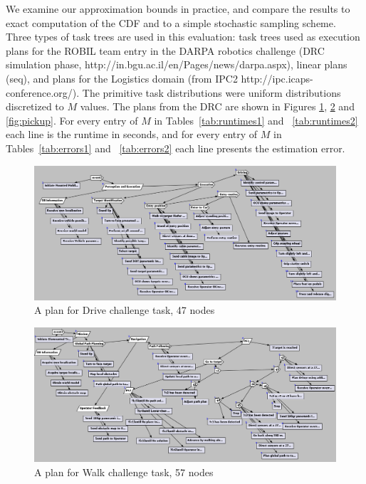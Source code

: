 \documentclass[review]{elsarticle}
\begin{document}
We examine our approximation bounds in practice, and compare the results to
exact computation of the CDF and to a simple stochastic sampling scheme. Three types of task trees
are used in this evaluation:
task trees used as execution plans for the ROBIL team entry in the DARPA
robotics challenge (DRC simulation phase, http://in.bgu.ac.il/en/Pages/news/dar\textunderscore pa.aspx), linear plans (seq), and plans for
the Logistics domain (from IPC2 http://ipc.icaps-conference.org/).
The primitive task distributions were uniform
distributions discretized to $M$ values.  
The plans from the DRC are shown in Figures {\ref{fig:drive}}, {\ref{fig:walk}} and {\ref{fig:pickup}}. For every entry of $M$ in Tables~\ref{tab:runtimes1} and ~\ref{tab:runtimes2} each line is the runtime in seconds, and for every entry of $M$ in Tables~\ref{tab:errors1} and ~\ref{tab:errors2} each line presents the estimation error.


\begin{figure}
	\begin{center}
	\includegraphics[width=\textwidth]{plan1}
	\caption{A plan for Drive challenge task, 47 nodes}
	\label{fig:drive}
	\end{center}
\end{figure}

\begin{figure}
	\begin{center}
	\includegraphics[width=\textwidth]{plan2}
	\caption{A plan for Walk challenge task, 57 nodes}
	\label{fig:walk}
	\end{center}
\end{figure}
\end{document}
